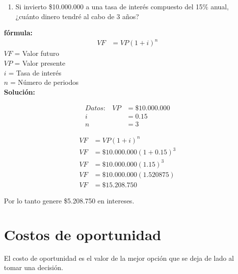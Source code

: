 \documentclass{templateNote}
\begin{document}
\begin{tcolorbox}[colback=blue!10!white,colframe=blue!60!black,title=Ejemplo]
    \begin{enumerate}
        \item Si invierto \$10.000.000 a una tasa de interés compuesto del 15\% anual, ¿cuánto dinero tendré al cabo de 3 años?
    \end{enumerate}
    \textbf{fórmula:}
    \begin{align*}
        VF &= VP(1 + i)^n
    \end{align*}
    $VF$ = Valor futuro\\
    $VP$ = Valor presente\\
    $i$ = Tasa de interés\\
    $n$ = Número de periodos\\
    \textbf{Solución:}\\
    \begin{minipage}{0.5\textwidth}
        \begin{align*}
            \textit{Datos:} \quad
            VP &= \$10.000.000\\
            i &= 0.15\\
            n &= 3
        \end{align*}
    \end{minipage}
    \begin{minipage}{0.5\textwidth}
        \begin{align*}
            VF &= VP(1 + i)^n\\
            VF &= \$10.000.000(1 + 0.15)^3\\
            VF &= \$10.000.000(1.15)^3\\
            VF &= \$10.000.000(1.520875)\\
            VF &= \$15.208.750
        \end{align*}
    \end{minipage}
    \center Por lo tanto genere \$5.208.750 en intereses.
\end{tcolorbox}
\newpage

\section{Costos de oportunidad}
\noindent El costo de oportunidad es el valor de la mejor opción que se deja de lado al tomar una decisión.
\end{document}
